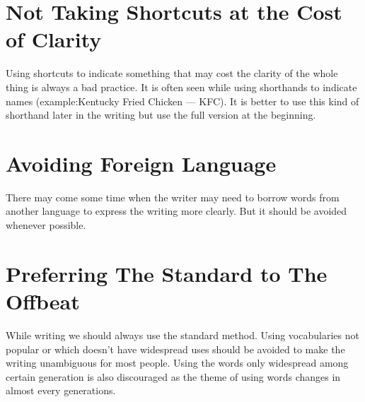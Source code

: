 \documentclass{report}
\begin{document}
\section{Not Taking Shortcuts at the Cost of Clarity}
Using shortcuts to indicate something that may cost the clarity of the whole thing is always a bad practice. It is often seen while using shorthands to indicate names (example:Kentucky Fried Chicken --- KFC). It is better to use this kind of shorthand later in the writing but use the full version at the beginning.
\section{Avoiding Foreign Language}
There may come some time when the writer may need to borrow words from another language to express the writing more clearly. But it should be avoided whenever possible. 
\section{Preferring The Standard to The Offbeat}
While writing we should always use the standard method. Using vocabularies not popular or which doesn't have widespread uses should be avoided to make the writing unambiguous for most people. Using the words only widespread among certain generation is also discouraged as the theme of using words changes in almost every generations.
\end{document}

